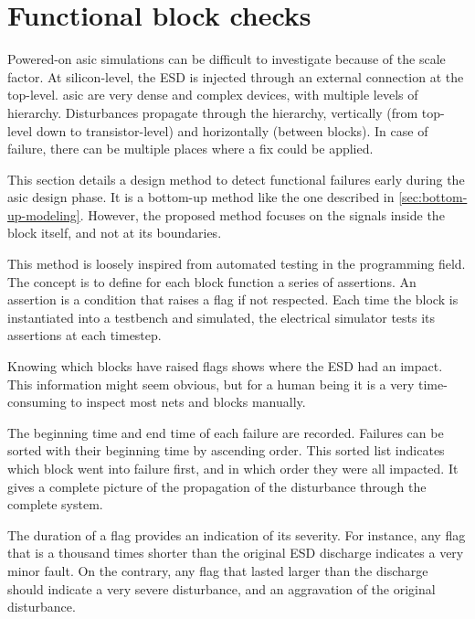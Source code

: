 \section{Functional block checks}

Powered-on \gls{asic} simulations can be difficult to investigate because of the scale factor.
At silicon-level, the ESD is injected through an external connection at the top-level.
\gls{asic} are very dense and complex devices, with multiple levels of hierarchy.
Disturbances propagate through the hierarchy, vertically (from top-level down to transistor-level) and horizontally (between blocks).
In case of failure, there can be multiple places where a fix could be applied.

This section details a design method to detect functional failures early during the \gls{asic} design phase.
It is a bottom-up method like the one described in \ref{sec:bottom-up-modeling}.
However, the proposed method focuses on the signals inside the block itself, and not at its boundaries.

This method is loosely inspired from automated testing in the programming field.
The concept is to define for each block function a series of assertions.
An assertion is a condition that raises a flag if not respected.
Each time the block is instantiated into a testbench and simulated, the electrical simulator tests its assertions at each timestep.

Knowing which blocks have raised flags shows where the ESD had an impact.
This information might seem obvious, but for a human being it is a very time-consuming to inspect most nets and blocks manually.

The beginning time and end time of each failure are recorded.
Failures can be sorted with their beginning time by ascending order.
This sorted list indicates which block went into failure first, and in which order they were all impacted.
It gives a complete picture of the propagation of the disturbance through the complete system.

The duration of a flag provides an indication of its severity.
For instance, any flag that is a thousand times shorter than the original \gls{ESD} discharge indicates a very minor fault.
On the contrary, any flag that lasted larger than the discharge should indicate a very severe disturbance, and an aggravation of the original disturbance.


